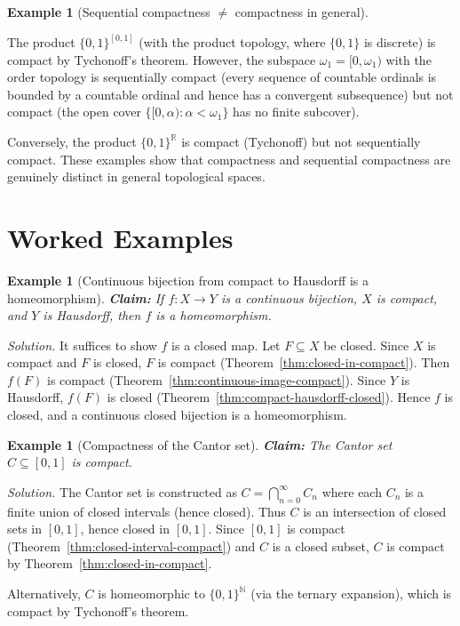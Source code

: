 \documentclass[11pt,a4paper,twoside]{book}
\theoremstyle{remark}
\theoremstyle{definition}
\newtheorem{exampleplain}[theorem]{Example}
\theoremstyle{definition}
\newenvironment{example}[1][]{%
  \begin{exampleplain}[#1]\itshape
}{%
  \end{exampleplain}
}
\begin{document}
\begin{example}[Sequential compactness $\neq$ compactness in general]
\label{ex:seq-compact-neq-compact}
The product $\{0,1\}^{[0,1]}$ (with the product topology, where $\{0,1\}$ is
discrete) is compact by Tychonoff's theorem.  However, the subspace
$\omega_1 = [0, \omega_1)$ with the order topology is sequentially compact
(every sequence of countable ordinals is bounded by a countable ordinal and
hence has a convergent subsequence) but not compact (the open cover
$\{[0,\alpha) : \alpha < \omega_1\}$ has no finite subcover).

Conversely, the product $\{0,1\}^{\mathbb{R}}$ is compact (Tychonoff) but
not sequentially compact.  These examples show that compactness and
sequential compactness are genuinely distinct in general topological spaces.
\end{example}

\section{Worked Examples}
\label{sec:compactness-worked}

\begin{example}[Continuous bijection from compact to Hausdorff is a
  homeomorphism]\label{ex:compact-to-hausdorff-homeo}
\textbf{Claim:} If $f \colon X \to Y$ is a continuous bijection, $X$ is
compact, and $Y$ is Hausdorff, then $f$ is a homeomorphism.

\textit{Solution.}  It suffices to show $f$ is a closed map.  Let
$F \subseteq X$ be closed.  Since $X$ is compact and $F$ is closed, $F$ is
compact (Theorem~\ref{thm:closed-in-compact}).  Then $f(F)$ is compact
(Theorem~\ref{thm:continuous-image-compact}).  Since $Y$ is Hausdorff, $f(F)$
is closed (Theorem~\ref{thm:compact-hausdorff-closed}).  Hence $f$ is closed,
and a continuous closed bijection is a homeomorphism.
\end{example}

\begin{example}[Compactness of the Cantor set]\label{ex:cantor-compact}
\textbf{Claim:} The Cantor set $C \subseteq [0,1]$ is compact.

\textit{Solution.}  The Cantor set is constructed as
$C = \bigcap_{n=0}^\infty C_n$ where each $C_n$ is a finite union of closed
intervals (hence closed).  Thus $C$ is an intersection of closed sets in
$[0,1]$, hence closed in $[0,1]$.  Since $[0,1]$ is compact
(Theorem~\ref{thm:closed-interval-compact}) and $C$ is a closed subset, $C$ is
compact by Theorem~\ref{thm:closed-in-compact}.

Alternatively, $C$ is homeomorphic to $\{0,1\}^{\mathbb{N}}$ (via the ternary
expansion), which is compact by Tychonoff's theorem.
\end{example}
\end{document}

